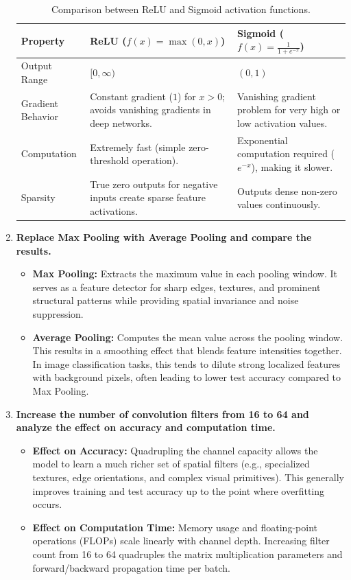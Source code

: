 \documentclass[11pt]{article}
\begin{document}
\begin{enumerate}
    \begin{table}[H]
    \centering
    \small
    \begin{tabular}{|l|p{5.5cm}|p{5.5cm}|}
    \hline
    \textbf{Property} & \textbf{ReLU} ($f(x) = \max(0, x)$) & \textbf{Sigmoid} ($f(x) = \frac{1}{1 + e^{-x}}$) \\ \hline
    Output Range & $[0, \infty)$ & $(0, 1)$ \\ \hline
    Gradient Behavior & Constant gradient ($1$) for $x > 0$; avoids vanishing gradients in deep networks. & Vanishing gradient problem for very high or low activation values. \\ \hline
    Computation & Extremely fast (simple zero-threshold operation). & Exponential computation required ($e^{-x}$), making it slower. \\ \hline
    Sparsity & True zero outputs for negative inputs create sparse feature activations. & Outputs dense non-zero values continuously. \\ \hline
    \end{tabular}
    \caption{Comparison between ReLU and Sigmoid activation functions.}
    \end{table}

    \item \textbf{Replace Max Pooling with Average Pooling and compare the results.}
    
    \begin{itemize}
        \item \textbf{Max Pooling:} Extracts the maximum value in each pooling window. It serves as a feature detector for sharp edges, textures, and prominent structural patterns while providing spatial invariance and noise suppression.
        \item \textbf{Average Pooling:} Computes the mean value across the pooling window. This results in a smoothing effect that blends feature intensities together. In image classification tasks, this tends to dilute strong localized features with background pixels, often leading to lower test accuracy compared to Max Pooling.
    \end{itemize}

    \item \textbf{Increase the number of convolution filters from 16 to 64 and analyze the effect on accuracy and computation time.}
    
    \begin{itemize}
        \item \textbf{Effect on Accuracy:} Quadrupling the channel capacity allows the model to learn a much richer set of spatial filters (e.g., specialized textures, edge orientations, and complex visual primitives). This generally improves training and test accuracy up to the point where overfitting occurs.
        \item \textbf{Effect on Computation Time:} Memory usage and floating-point operations (FLOPs) scale linearly with channel depth. Increasing filter count from 16 to 64 quadruples the matrix multiplication parameters and forward/backward propagation time per batch.
    \end{itemize}
\end{enumerate}
\end{document}
